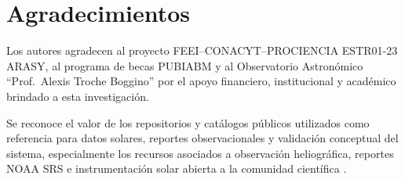\section{Agradecimientos}

Los autores agradecen al proyecto FEEI--CONACYT--PROCIENCIA ESTR01-23 ARASY, al programa de becas PUBIABM y al Observatorio Astronómico ``Prof.~Alexis Troche Boggino'' por el apoyo financiero, institucional y académico brindado a esta investigación.

Se reconoce el valor de los repositorios y catálogos públicos utilizados como referencia para datos solares, reportes observacionales y validación conceptual del sistema, especialmente los recursos asociados a observación heliográfica, reportes NOAA SRS e instrumentación solar abierta a la comunidad científica \citep{noaaSRS,scherrer2012hmi,bobra2014sharp,sidcGroundObservations2026}.